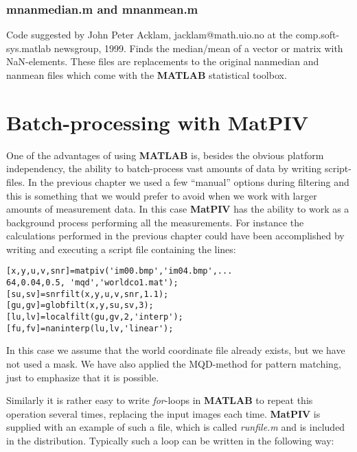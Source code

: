 \documentclass{book}
\begin{document}
\subsubsection{mnanmedian.m and mnanmean.m}
Code suggested by John Peter Acklam, jacklam@math.uio.no at the
comp.soft-sys.matlab newsgroup, 1999. Finds the median/mean of a
vector or matrix with NaN-elements. These files are replacements to
the original nanmedian and nanmean files which come with the {\bf
MATLAB} statistical toolbox. 


\section{Batch-processing with {\bf MatPIV}}
\label{batch}
One of the advantages of using {\bf MATLAB} is, besides the obvious
platform independency, the ability to batch-process vast amounts of data
by writing script-files. In the previous chapter we used a few
``manual'' options during filtering and this is something that we would
prefer to avoid when we work with larger amounts of measurement data. In
this case {\bf MatPIV} has the ability to work as a background process
performing all the measurements. For instance the calculations performed
in the previous chapter could have been accomplished by writing and
executing a script file containing the lines:
\begin{verbatim}
[x,y,u,v,snr]=matpiv('im00.bmp','im04.bmp',...
64,0.04,0.5, 'mqd','worldco1.mat');
[su,sv]=snrfilt(x,y,u,v,snr,1.1);
[gu,gv]=globfilt(x,y,su,sv,3);
[lu,lv]=localfilt(gu,gv,2,'interp');
[fu,fv]=naninterp(lu,lv,'linear');
\end{verbatim}

In this case we assume that the world coordinate file already exists,
but we have not used a mask. We have also applied the MQD-method for
pattern matching, just to emphasize that it is possible.

Similarly it is rather easy to write {\em for}-loops in {\bf MATLAB}
to repeat this operation several times, replacing the input images
each time. {\bf MatPIV} is supplied with an example of such a file,
which is called {\em runfile.m} and is included in the
distribution. Typically such a loop can be written in the following
way:
\end{document}
